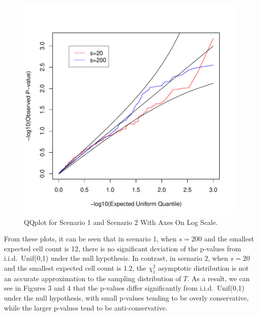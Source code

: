 \documentclass[article]{jss}
\begin{document}
\begin{figure}
\begin{center}
\includegraphics{manuscript-chisq_qq_log}
\end{center}
\caption{QQplot for Scenario 1 and Scenario 2 With Axes On Log Scale.}
\end{figure}

From these plots, it can be seen that in scenario 1, when $s=200$ and the smallest expected cell count is 12, there is no significant deviation of the p-values from i.i.d.\ Unif(0,1) under the null hypothesis.  In contrast, in scenario 2, when $s=20$ and the smallest expected cell count is 1.2, the $\chi^2_1$ asymptotic distribution is not an accurate approximation to the sampling distribution of $T$.  As a result, we can see in Figures 3 and 4 that the p-values differ significantly from i.i.d.\ Unif(0,1) under the null hypothesis, with small p-values tending to be overly conservative, while the larger p-values tend to be anti-conservative.
\end{document}
